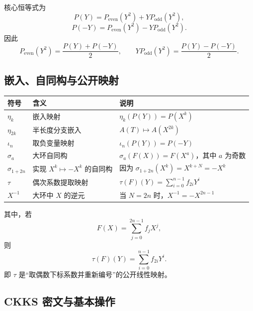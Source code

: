 \documentclass[11pt]{article}
\newcommand{\Pe}{P_{\mathrm{even}}}
\newcommand{\Po}{P_{\mathrm{odd}}}
\begin{document}
核心恒等式为
\[
P(Y)=\Pe(Y^2)+Y\Po(Y^2),
\]
\[
P(-Y)=\Pe(Y^2)-Y\Po(Y^2).
\]
因此
\[
\Pe(Y^2)=\frac{P(Y)+P(-Y)}{2},
\qquad
Y\Po(Y^2)=\frac{P(Y)-P(-Y)}{2}.
\]

\subsection{嵌入、自同构与公开映射}

\begin{center}
\begin{tabular}{lll}
\toprule
符号 & 含义 & 说明 \\
\midrule
\(\eta_k\) & 嵌入映射 & \(\eta_k(P(Y))=P(X^k)\) \\
\(\eta_{2k}\) & 半长度分支嵌入 & \(A(T)\mapsto A(X^{2k})\) \\
\(\iota_n\) & 取负变量映射 & \(\iota_n(P(Y))=P(-Y)\) \\
\(\sigma_a\) & 大环自同构 & \(\sigma_a(F(X))=F(X^a)\)，其中 \(a\) 为奇数 \\
\(\sigma_{1+2n}\) & 实现 \(X^k\mapsto -X^k\) 的自同构 & 因为 \(\sigma_{1+2n}(X^k)=X^{k+N}=-X^k\) \\
\(\tau\) & 偶次系数提取映射 & \(\tau(F)(Y)=\sum_{i=0}^{n-1}f_{2i}Y^i\) \\
\(X^{-1}\) & 大环中 \(X\) 的逆元 & 当 \(N=2n\) 时，\(X^{-1}=-X^{2n-1}\) \\
\bottomrule
\end{tabular}
\end{center}

其中，若
\[
F(X)=\sum_{j=0}^{2n-1}f_jX^j,
\]
则
\[
\tau(F)(Y)=\sum_{i=0}^{n-1}f_{2i}Y^i.
\]
即 \(\tau\) 是“取偶数下标系数并重新编号”的公开线性映射。

\subsection{CKKS 密文与基本操作}
\end{document}
